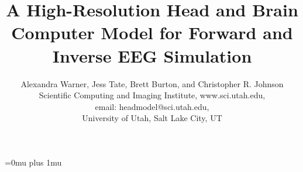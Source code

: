 \documentclass[11pt]{article}
\begin{document}
\title{A High-Resolution Head and Brain Computer Model for Forward and Inverse EEG Simulation}
\author{Alexandra Warner, Jess Tate, Brett Burton, and Christopher R. Johnson \\
Scientific Computing and Imaging Institute, www.sci.utah.edu, \\
email: headmodel@sci.utah.edu,\\
 University of Utah, Salt Lake City, UT\\}
\maketitle







\begin{appendices}

\end{appendices}

\newpage
\Urlmuskip=0mu plus 1mu\relax


\end{document}
